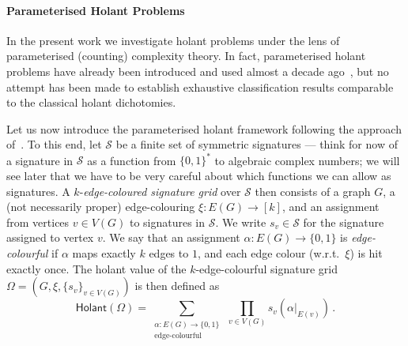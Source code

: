 \documentclass[authorcolumns,numberwithinsect]{no-lipics-v2022}
\newcommand{\holant}{\mathsf{Holant}}
\begin{document}
\paragraph*{Parameterised Holant Problems}
In the present work we investigate holant problems under the lens of parameterised (counting) complexity theory. In fact, parameterised holant problems have already been introduced and used almost a decade ago~\cite{Curticapean15}, but no attempt has been made to establish exhaustive classification results comparable to the classical holant dichotomies. 

Let us now introduce the parameterised holant framework following the approach of~\cite{Curticapean15}. To this end, let $\mathcal{S}$ be a finite set of symmetric signatures --- think for now of a signature in $\mathcal{S}$ as a function from $\{0,1\}^\ast$ to algebraic complex numbers; we will see later that we have to be very careful about which functions we can allow as signatures. A $k$-\emph{edge-coloured signature grid} over $\mathcal{S}$ then consists of a graph $G$, a (not necessarily proper) edge-colouring $\xi:E(G)\to [k]$, and an assignment from vertices $v\in V(G)$ to signatures in $\mathcal{S}$. We write $s_v\in \mathcal{S}$ for the signature assigned to vertex $v$. We say that an assignment $\alpha:E(G) \to \{0,1\}$ is \emph{edge-colourful} if $\alpha$ maps exactly $k$ edges to $1$, and each edge colour (w.r.t.\ $\xi$) is hit exactly once. The holant value of the $k$-edge-colourful signature grid $\Omega=(G,\xi,\{s_v\}_{v\in V(G)})$ is then defined as
\[ \holant(\Omega)= \sum_{\substack{\alpha: E(G)\to \{0,1\}\\\text{edge-colourful}}} ~\prod_{v\in V(G)} s_v(\alpha|_{E(v)}) \,.\]
\end{document}
